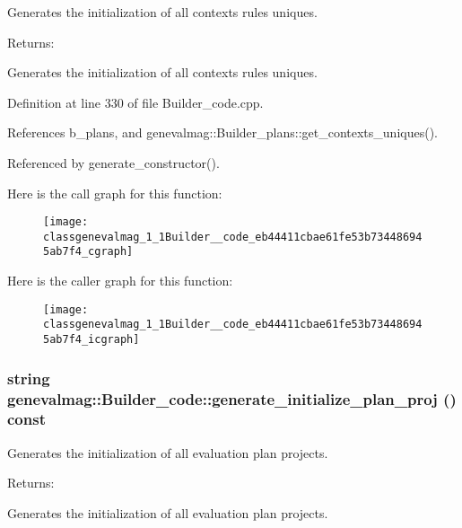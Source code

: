 Generates the initialization of all contexts rules uniques. \begin{Desc}
\item[Returns:]\end{Desc}
Generates the initialization of all contexts rules uniques. 

Definition at line 330 of file Builder\_\-code.cpp.

References b\_\-plans, and genevalmag::Builder\_\-plans::get\_\-contexts\_\-uniques().

Referenced by generate\_\-constructor().

Here is the call graph for this function:\nopagebreak
\begin{figure}[H]
\begin{center}
\leavevmode
\texttt{[image: classgenevalmag\_1\_1Builder\_\_code\_eb44411cbae61fe53b734486945ab7f4\_cgraph]}
\end{center}
\end{figure}


Here is the caller graph for this function:\nopagebreak
\begin{figure}[H]
\begin{center}
\leavevmode
\texttt{[image: classgenevalmag\_1\_1Builder\_\_code\_eb44411cbae61fe53b734486945ab7f4\_icgraph]}
\end{center}
\end{figure}
\hypertarget{classgenevalmag_1_1Builder__code_76c0b81220998ec7e604184fab7a15fe}{
\subsubsection[{generate\_\-initialize\_\-plan\_\-proj}]{\setlength{\rightskip}{0pt plus 5cm}string genevalmag::Builder\_\-code::generate\_\-initialize\_\-plan\_\-proj () const}}
\label{classgenevalmag_1_1Builder__code_76c0b81220998ec7e604184fab7a15fe}


Generates the initialization of all evaluation plan projects. \begin{Desc}
\item[Returns:]\end{Desc}
Generates the initialization of all evaluation plan projects. 

